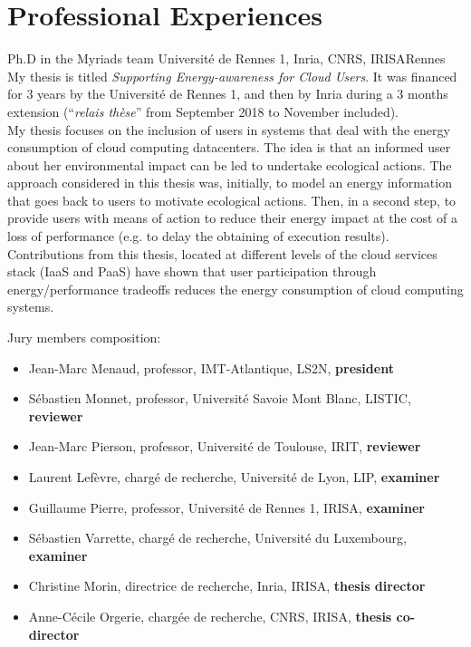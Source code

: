 \documentclass[11pt,a4paper]{moderncv}
\begin{document}
\section{Professional Experiences}
  {Ph.D in the Myriads team}
  {Université de Rennes 1, Inria, CNRS, IRISA}{Rennes}{}
  {My thesis is titled \textit{Supporting Energy-awareness for Cloud Users}. It was financed for 3 years by the Université de Rennes 1, and then by Inria during a 3 months extension (``\textit{relais thèse}'' from September 2018 to November included).\\\newline
  My thesis focuses on the inclusion of users in systems that deal with the energy consumption of cloud computing datacenters. The idea is that an informed user about her environmental impact can be led to undertake ecological actions. The approach considered in this thesis was, initially, to model an energy information that goes back to users to motivate ecological actions. Then, in a second step, to provide users with means of action to reduce their energy impact at the cost of a loss of performance (e.g. to delay the obtaining of execution results). Contributions from this thesis, located at different levels of the cloud services stack (IaaS and PaaS) have shown that user participation through energy/performance tradeoffs reduces the energy consumption of cloud computing systems.}

\cventry{}{}{}{}{}
  {\vspace{-2em}Jury members composition: 
  \begin{itemize}
    \item Jean-Marc Menaud, professor, IMT-Atlantique, LS2N, \textbf{president}
    \item Sébastien Monnet, professor, Université Savoie Mont Blanc, LISTIC, \textbf{reviewer}
    \item Jean-Marc Pierson, professor, Université de Toulouse, IRIT, \textbf{reviewer}
    \item Laurent Lefèvre, chargé de recherche, Université de Lyon, LIP, \textbf{examiner}
    \item Guillaume Pierre, professor, Université de Rennes 1, IRISA, \textbf{examiner}
    \item Sébastien Varrette, chargé de recherche, Université du Luxembourg, \textbf{examiner}
    \item Christine Morin, directrice de recherche, Inria, IRISA, \textbf{thesis director}
    \item Anne-Cécile Orgerie, chargée de recherche, CNRS, IRISA, \textbf{thesis co-director}
  \end{itemize}}
\vspace{0.6em}
\end{document}
